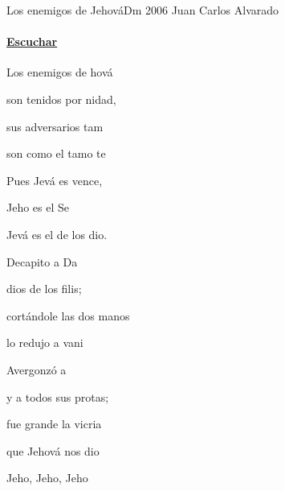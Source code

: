\documentclass[12pt, spanish]{book}
\begin{document}
    \begin{song}{Los enemigos de Jehová}{Dm}
        {2006} %
        {Juan Carlos Alvarado}
        {} %
        {}
        \ifChordBk
        \paragraph{\mbox{}\hfill\protect\href{https://open.spotify.com/intl-es/track/3wwROWXzKHnbTPGehmBeVs}{Escuchar}\mbox{}\hfill}
        \fi


        \begin{SBOpGroup}
            Los enemigos de hová

            son tenidos por nidad,

            sus adversarios tam

            son como el tamo te 
        \end{SBOpGroup}

        \begin{SBChorus}
            Pues Jevá es vence,

            Jeho es el Se

            Jevá es el  de los dio. 
        \end{SBChorus}

        \begin{SBOpGroup}
            Decapito a Da

            dios de los filis;

            cortándole las dos manos

            lo redujo a vani
        \end{SBOpGroup}
        \vskip 20pt
        \begin{SBOpGroup}
            Avergonzó a 

            y a todos sus protas;

            fue grande la vicria

            que Jehová nos dio
        \end{SBOpGroup}
        \vskip 20pt
        \begin{SBOpGroup}
            Jeho, Jeho, Jeho


\end{SBOpGroup}
\end{song}
\end{document}
